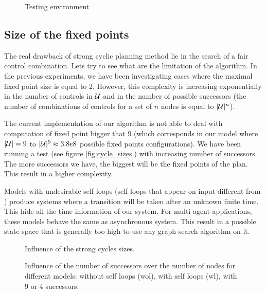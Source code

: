 \begin{figure}
	
	\caption{Testing environment}
	\label{fig:simple_int_sl}
\end{figure}

\subsection{Size of the fixed points}
%
The real drawback of strong cyclic planning method lie in the search of a fair control combination. Lets try to see what are the limitation of the algorithm.
In the previous experiments, we have been investigating cases where the maximal fixed point size is equal to 2. However, this complexity is increasing exponentially in the number of controls in $\mathcal{U}$ and in the number of possible successors (the number of combinations of controls for a set of $n$ nodes is equal to $|\mathcal{U}|^n$).

The current implementation of our algorithm is not able to deal with computation of fixed point bigger that 9 (which corresponds in our model where $|\mathcal{U}|= 9$ to $|\mathcal{U}|^9 \approx 3.8e8$ possible fixed points configurations).
We have been running a test (see figure \ref{fig:cycle_sizes}) with increasing number of successors. 
The more successors we have, the biggest will be the fixed points of the plan. This result in a higher complexity.

Models with undesirable self loops (self loops that appear on input different from \uo) produce systems where a transition will be taken after an unknown finite time.
This hide all the time information of our system.
For multi agent applications, these models behave the same as asynchronous system.
This result in a possible state space that is generally too high to use any graph search algorithm on it.

\begin{figure}
\centering
\begin{minipage}[t]{0.49\linewidth}
	
	\caption{Influence of the strong cycles sizes.}
	\label{fig:cycle_sizes}
\end{minipage}
\begin{minipage}[t]{0.49\linewidth}
	
	\caption{Influence of the number of successors over the number of nodes for different models: without self loops (wol), with self loops (wl), with 9 or 4 successors.}
	\label{fig:max_cycle_tree}
\end{minipage}
\end{figure}

